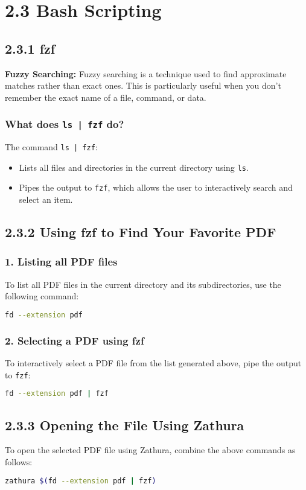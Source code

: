 \documentclass[12pt]{article}
\begin{document}
\section*{2.3 Bash Scripting}

\subsection*{2.3.1 fzf}
\textbf{Fuzzy Searching:} Fuzzy searching is a technique used to find approximate matches rather than exact ones. This is particularly useful when you don't remember the exact name of a file, command, or data.

\subsubsection*{What does \texttt{ls | fzf} do?}
The command \texttt{ls | fzf}:
\begin{itemize}
    \item Lists all files and directories in the current directory using \texttt{ls}.
    \item Pipes the output to \texttt{fzf}, which allows the user to interactively search and select an item.
\end{itemize}

\subsection*{2.3.2 Using fzf to Find Your Favorite PDF}

\subsubsection*{1. Listing all PDF files}
To list all PDF files in the current directory and its subdirectories, use the following command:
\begin{lstlisting}[language=bash]
fd --extension pdf
\end{lstlisting}

\subsubsection*{2. Selecting a PDF using fzf}
To interactively select a PDF file from the list generated above, pipe the output to \texttt{fzf}:
\begin{lstlisting}[language=bash]
fd --extension pdf | fzf
\end{lstlisting}

\subsection*{2.3.3 Opening the File Using Zathura}
To open the selected PDF file using Zathura, combine the above commands as follows:
\begin{lstlisting}[language=bash]
zathura $(fd --extension pdf | fzf)
\end{lstlisting}
\end{document}
